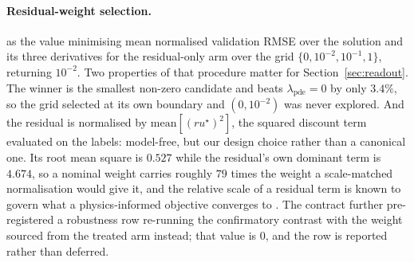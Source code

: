 \documentclass{article}
\begin{document}
\paragraph{Residual-weight selection.} as the value minimising mean normalised validation RMSE over the solution and its
three derivatives for the residual-only arm over the grid
$\{0, 10^{-2}, 10^{-1}, 1\}$, returning $10^{-2}$. Two properties of that procedure
matter for Section~\ref{sec:readout}. The winner is the smallest non-zero candidate
and beats $\lambda_{\mathrm{pde}} = 0$ by only $3.4\%$, so the grid selected at its
own boundary and $(0, 10^{-2})$ was never explored. And the residual is normalised
by $\mathrm{mean}[(ru^{\star})^{2}]$, the squared discount term evaluated on the
labels: model-free, but our design choice rather than a canonical one. Its root mean
square is $0.527$ while the residual's own dominant term is $4.674$, so a nominal
weight carries roughly $79$ times the weight a scale-matched normalisation would
give it, and the relative scale of a residual term is known to govern what a
physics-informed objective converges to \citep{wang2021understanding}. The contract
further pre-registered a robustness row re-running the confirmatory contrast with
the weight sourced from the treated arm instead; that value is $0$, and the row is
reported rather than deferred.
\end{document}
